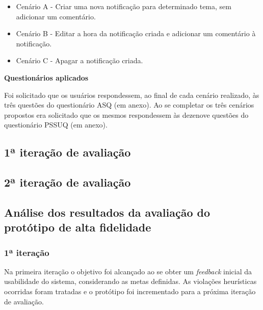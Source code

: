       \begin{itemize}
	  \item Cenário A - Criar uma nova notificação para determinado tema, sem adicionar um comentário.
	  \item Cenário B - Editar a hora da notificação criada e adicionar um comentário à notificação.
	  \item Cenário C - Apagar a notificação criada.
      \end{itemize}
      
      \noindent
      \textbf{Questionários aplicados}
      
	Foi solicitado que os usuários respondessem, ao final de cada cenário realizado, às três questões do
	questionário ASQ (em anexo). Ao se completar os três cenários propostos era solicitado que os mesmos 
	respondessem às dezenove questões do questionário PSSUQ (em anexo).
    
    \subsection{1ª iteração de avaliação}
      
	
  
      \pagebreak
      
    \subsection{2ª iteração de avaliação}
	
	
  
    \pagebreak
    \subsection{Análise dos resultados da avaliação do protótipo de alta fidelidade}
     
      
      \subsubsection{1ª iteração}
      
	Na primeira iteração o objetivo foi alcançado ao se obter um \textit{feedback} inicial da usabilidade do
	sistema, considerando as metas definidas. As violações heurísticas ocorridas foram tratadas e o protótipo foi
	incrementado para a próxima iteração de avaliação.
      
